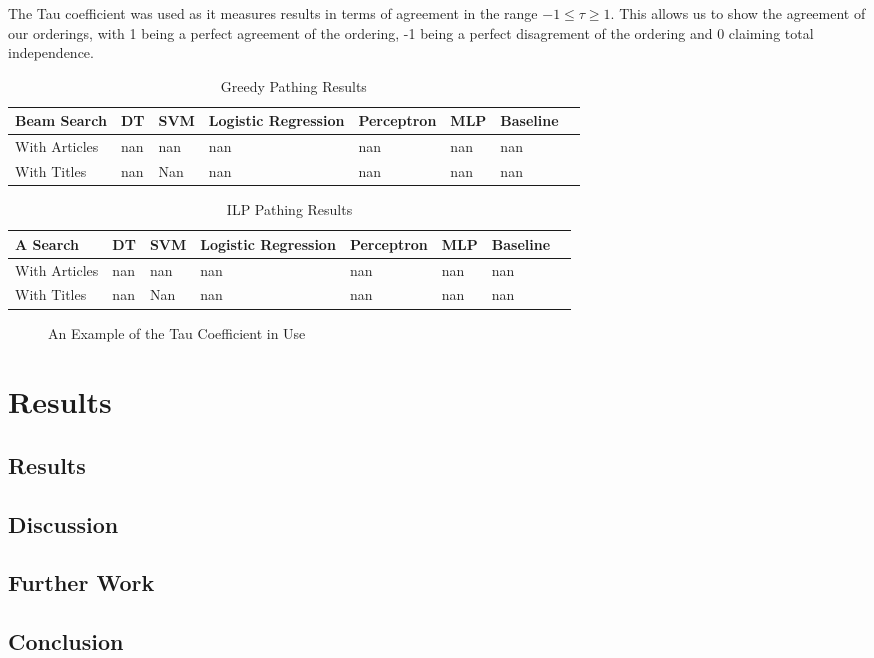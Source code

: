 \documentclass[bsc,frontabs,twoside,singlespacing,parskip,deptreport]{infthesis}     %
\begin{document}
The Tau coefficient was used as it measures results in terms of agreement in the range $-1 \leq \tau \geq 1$.
This allows us to show the agreement of our orderings, with 1 being a perfect agreement of the ordering, -1 being a perfect disagrement of the ordering and 0 claiming
total independence.


\begin{table}[H]
\centering
\label{table:greedy-results}
\begin{tabular}{|l|l|l|l|l|l|l|l|}
  \hline
  Beam Search & DT & SVM &Logistic Regression & Perceptron & MLP & Baseline\\
  \hline
With Articles & nan & nan &nan& nan   & nan  & nan\\
\hline
With Titles & nan & Nan & nan & nan  & nan & nan\\
\hline
\end{tabular}
\caption{Greedy Pathing Results}
\end{table}



\begin{table}[H]
\centering
\label{table:ILP-results}
\begin{tabular}{|l|l|l|l|l|l|l|l|}
  \hline
  A\* Search & DT & SVM &Logistic Regression & Perceptron & MLP & Baseline\\
  \hline
With Articles & nan & nan &nan& nan   & nan  & nan\\
\hline
With Titles & nan & Nan & nan & nan  & nan & nan\\
\hline
\end{tabular}
\caption{ILP Pathing Results}
\end{table}


\begin{figure}
  \caption{An Example of the Tau Coefficient in Use}
  \label{fig:tau}
\end{figure}




\chapter{Results}
\section{Results}
\section{Discussion}
\section{Further Work}
\section{Conclusion}


\end{document}
